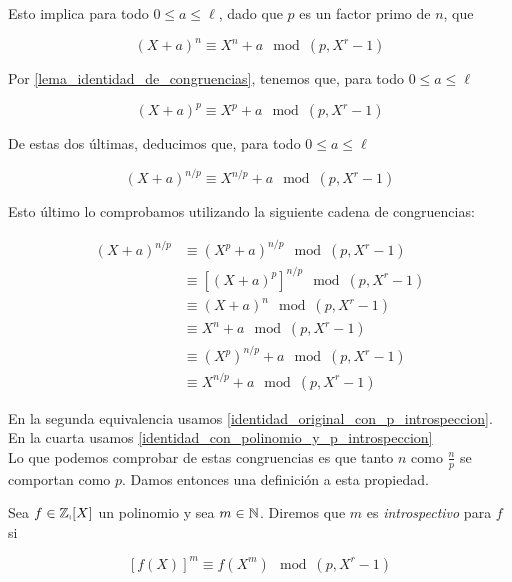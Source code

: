 Esto implica para todo $0 \leq a \leq \ell$, dado que $p$ es un factor primo de $n$, que

\begin{equation}\label{identidad_con_polinomio_y_p_introspeccion}
(X + a)^n \equiv X^n + a \mod(p, X^r - 1)
\end{equation}

Por \autoref{lema_identidad_de_congruencias}, tenemos que, para todo $0 \leq a \leq \ell$

\begin{equation}\label{identidad_original_con_p_introspeccion}
(X + a)^p \equiv X^p + a \mod(p, X^r - 1)
\end{equation}

De estas dos últimas, deducimos que, para todo $0 \leq a \leq \ell$

\begin{equation}\label{identidad_np_introspeccion}
(X + a)^{n/p} \equiv X^{n/p} + a \mod(p, X^r - 1)
\end{equation}

Esto último lo comprobamos utilizando la siguiente cadena de congruencias:

\begin{align}
(X + a)^{n/p} &\equiv (X^p + a)^{n/p} \mod(p, X^r - 1)\\
&\equiv \left[(X + a)^p\right]^{n/p} \mod(p, X^r - 1)\\
&\equiv (X + a)^n \mod(p, X^r - 1)\\
&\equiv X^n + a \mod(p, X^r - 1)\\
&\equiv (X^p)^{n/p} + a \mod(p, X^r - 1)\\
&\equiv X^{n/p} + a \mod(p, X^r - 1)
\end{align}

En la segunda equivalencia usamos \eqref{identidad_original_con_p_introspeccion}. En la cuarta usamos \eqref{identidad_con_polinomio_y_p_introspeccion}\\

Lo que podemos comprobar de estas congruencias es que tanto $n$ como $\frac{n}{p}$ se comportan como $p$. Damos entonces una definición a esta propiedad.

\begin{definicion}
	Sea $f \in \mathbb{\mathbb{Z}_p}[X]$ un polinomio y sea $m \in \mathbb{N}$. Diremos que $m$ es \textit{introspectivo} para $f$ si
	
	\[ \left[f(X)\right]^m \equiv f(X^m) \mod(p, X^r - 1) \]
\end{definicion}

